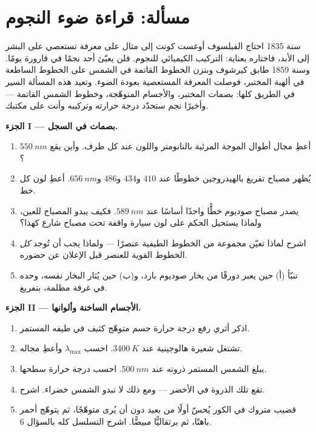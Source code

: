 \section{مسألة: قراءة ضوء النجوم}

\begin{problem}
\label{pb:g10:light-spectra:1}
سنة 1835 احتاج الفيلسوف أوغست كونت إلى مثال على معرفة
تستعصي على البشر إلى الأبد، فاختاره بعناية: التركيب
الكيميائي للنجوم. فلن يعبّئ أحد نجمًا في قارورة يومًا. وسنة 1859
طابق كيرشوف وبنزن الخطوط القاتمة في الشمس على الخطوط
الساطعة في ألهبة المختبر، فوصلت المعرفة المستعصية
بعودة الضوء. وتعيد هذه المسألة السير في الطريق كلها: بصمات
المختبر، والأجسام المتوهّجة، وخطوط الشمس القاتمة --- وأخيرًا
نجم ستحدّد درجة حرارته وتركيبه وأنت على
مكتبك.

\medskip
\noindent\textbf{الجزء I --- بصمات في السجل.}
\begin{enumerate}
  \item أعطِ مجال أطوال الموجة المرئية بالنانومتر واللون
        عند كل طرف. وأين يقع $\qty{550}{nm}$؟
  \item يُظهر مصباح تفريغ بالهيدروجين خطوطًا عند $410$ و$434$ و$486$
        و$\qty{656}{nm}$. أعطِ لون كل خط.
  \item يصدر مصباح صوديوم خطًّا واحدًا أساسًا عند $\qty{589}{nm}$.
        فكيف يبدو المصباح للعين، ولماذا يستحيل
        الحكم على لون سيارة واقفة تحت مصباح شارع كهذا؟
  \item اشرح لماذا تعيّن مجموعة من الخطوط الطيفية عنصرًا ---
        ولماذا يجب أن تُوجد \emph{كل} الخطوط القوية للعنصر
        قبل الإعلان عن حضوره.
  \item تنبّأ  (أ) حين يعبر  دورقًا
        من بخار صوديوم بارد، و(ب) حين يُثار البخار نفسه، وحده في
        غرفة مظلمة، بتفريغ.
\end{enumerate}

\medskip
\noindent\textbf{الجزء II --- الأجسام الساخنة وألوانها.}
\begin{enumerate}[resume]
  \item اذكر أثري رفع درجة حرارة جسم متوهّج
        كثيف في طيفه المستمر.
  \item تشتغل شعيرة هالوجينية عند $\qty{3400}{K}$. احسب
        $\lambda_{\max}$ وأعطِ مجاله.
  \item يبلغ  الشمس المستمر ذروته عند $\qty{500}{nm}$. احسب
        درجة حرارة سطحها.
  \item تقع تلك الذروة في الأخضر --- ومع ذلك لا تبدو الشمس
        خضراء. اشرح.
  \item قضيب متروك في الكور يُحسّ أولًا من بعيد دون
        أن يُرى متوهّجًا، ثم يتوهّج أحمر باهتًا، ثم برتقاليًّا مبيضًّا.
        اشرح التسلسل كله بالسؤال 6.
\end{enumerate}


\end{problem}
